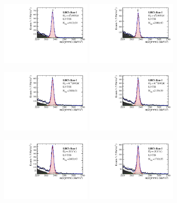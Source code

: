 \begin{figure}[h]
\centering
\includegraphics[height=!,width=0.4\textwidth]{figs/MassFit/norm_Run1_phipi_t0.pdf}
\includegraphics[height=!,width=0.4\textwidth]{figs/MassFit/norm_Run1_phipi_t1.pdf}

\includegraphics[height=!,width=0.4\textwidth]{figs/MassFit/norm_Run1_KsK_t0.pdf}
\includegraphics[height=!,width=0.4\textwidth]{figs/MassFit/norm_Run1_KsK_t1.pdf}

\includegraphics[height=!,width=0.4\textwidth]{figs/MassFit/norm_Run1_KKpi_NR_t0.pdf}
\includegraphics[height=!,width=0.4\textwidth]{figs/MassFit/norm_Run1_KKpi_NR_t1.pdf}


\end{figure}
